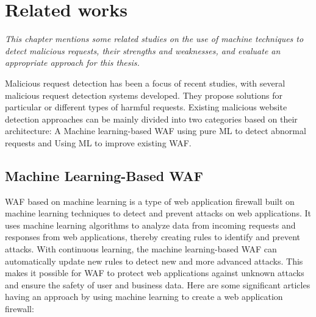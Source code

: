 \chapter{Related works}
\label{chap:literaturereview}
	\textit{This chapter mentions some related studies on the use of machine techniques to detect malicious requests, their strengths and weaknesses, and evaluate an appropriate approach for this thesis.}
\minitoc
\newpage	

Malicious request detection has been a focus of recent studies, with several malicious request detection systems developed. They propose solutions for particular or different types of harmful requests. Existing malicious website detection approaches can be mainly divided into two categories based on their architecture: A Machine learning-based WAF using pure ML to detect abnormal requests and Using ML to improve existing WAF.

\section{Machine Learning-Based WAF}
\label{sec:machine_learning_based}
WAF based on machine learning is a type of web application firewall built on machine learning techniques to detect and prevent attacks on web applications. It uses machine learning algorithms to analyze data from incoming requests and responses from web applications, thereby creating rules to identify and prevent attacks.
With continuous learning, the machine learning-based WAF can automatically update new rules to detect new and more advanced attacks. This makes it possible for WAF to protect web applications against unknown attacks and ensure the safety of user and business data. Here are some significant articles having an approach by using machine learning to create a web application firewall: 


